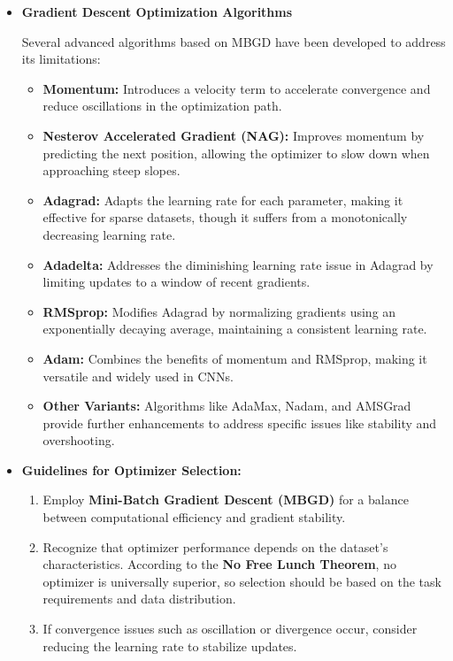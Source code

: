 \begin{itemize}
	\item \textbf{Gradient Descent Optimization Algorithms}
	
	Several advanced algorithms based on MBGD have been developed to address its limitations:
	
	\begin{itemize}
		\item \textbf{Momentum:} Introduces a velocity term to accelerate convergence and reduce oscillations in the optimization path.
		\item \textbf{Nesterov Accelerated Gradient (NAG):} Improves momentum by predicting the next position, allowing the optimizer to slow down when approaching steep slopes.
		\item \textbf{Adagrad:} Adapts the learning rate for each parameter, making it effective for sparse datasets, though it suffers from a monotonically decreasing learning rate.
		\item \textbf{Adadelta:} Addresses the diminishing learning rate issue in Adagrad by limiting updates to a window of recent gradients.
		\item \textbf{RMSprop:} Modifies Adagrad by normalizing gradients using an exponentially decaying average, maintaining a consistent learning rate.
		\item \textbf{Adam:} Combines the benefits of momentum and RMSprop, making it versatile and widely used in CNNs.
		\item \textbf{Other Variants:} Algorithms like AdaMax, Nadam, and AMSGrad provide further enhancements to address specific issues like stability and overshooting.
	\end{itemize}
	
	\item \textbf{Guidelines for Optimizer Selection:}
	\begin{enumerate}
		\item Employ \textbf{Mini-Batch Gradient Descent (MBGD)} for a balance between computational efficiency and gradient stability.
		\item Recognize that optimizer performance depends on the dataset's characteristics. According to the \textbf{No Free Lunch Theorem}, no optimizer is universally superior, so selection should be based on the task requirements and data distribution.
		\item If convergence issues such as oscillation or divergence occur, consider reducing the learning rate to stabilize updates.
	\end{enumerate}
\end{itemize}

